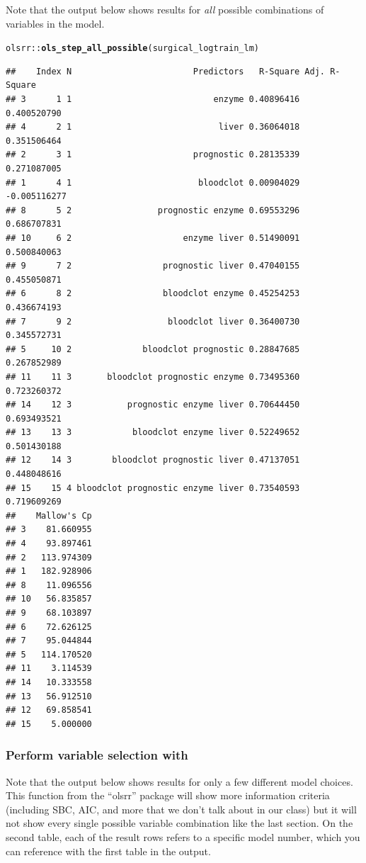 \documentclass{article}\usepackage[]{graphicx}\usepackage[]{color}
\makeatletter
\newcommand{\hlopt}[1]{\textcolor[rgb]{0,0,0}{#1}}%
\newcommand{\hlstd}[1]{\textcolor[rgb]{0.345,0.345,0.345}{#1}}%
\newcommand{\hlkwd}[1]{\textcolor[rgb]{0.737,0.353,0.396}{\textbf{#1}}}%
\newenvironment{kframe}{%
 \def\at@end@of@kframe{}%
 \ifinner\ifhmode%
  \def\at@end@of@kframe{\end{minipage}}%
  \begin{minipage}{\columnwidth}%
 \fi\fi%
 \def\FrameCommand##1{\hskip\@totalleftmargin \hskip-\fboxsep
 \colorbox{shadecolor}{##1}\hskip-\fboxsep
     \hskip-\linewidth \hskip-\@totalleftmargin \hskip\columnwidth}%
 \MakeFramed {\advance\hsize-\width
   \@totalleftmargin\z@ \linewidth\hsize
   \@setminipage}}%
 {\par\unskip\endMakeFramed%
 \at@end@of@kframe}
\newenvironment{knitrout}{}{} %
\makeatother
\begin{document}
Note that the output below shows results for \textit{all} possible combinations of variables in the model.

\begin{knitrout}
\color{fgcolor}\begin{kframe}
\begin{alltt}
\hlstd{olsrr}\hlopt{::}\hlkwd{ols_step_all_possible}\hlstd{(surgical_logtrain_lm)}
\end{alltt}
\begin{verbatim}
##    Index N                        Predictors   R-Square Adj. R-Square
## 3      1 1                            enzyme 0.40896416   0.400520790
## 4      2 1                             liver 0.36064018   0.351506464
## 2      3 1                        prognostic 0.28135339   0.271087005
## 1      4 1                         bloodclot 0.00904029  -0.005116277
## 8      5 2                 prognostic enzyme 0.69553296   0.686707831
## 10     6 2                      enzyme liver 0.51490091   0.500840063
## 9      7 2                  prognostic liver 0.47040155   0.455050871
## 6      8 2                  bloodclot enzyme 0.45254253   0.436674193
## 7      9 2                   bloodclot liver 0.36400730   0.345572731
## 5     10 2              bloodclot prognostic 0.28847685   0.267852989
## 11    11 3       bloodclot prognostic enzyme 0.73495360   0.723260372
## 14    12 3           prognostic enzyme liver 0.70644450   0.693493521
## 13    13 3            bloodclot enzyme liver 0.52249652   0.501430188
## 12    14 3        bloodclot prognostic liver 0.47137051   0.448048616
## 15    15 4 bloodclot prognostic enzyme liver 0.73540593   0.719609269
##    Mallow's Cp
## 3    81.660955
## 4    93.897461
## 2   113.974309
## 1   182.928906
## 8    11.096556
## 10   56.835857
## 9    68.103897
## 6    72.626125
## 7    95.044844
## 5   114.170520
## 11    3.114539
## 14   10.333558
## 13   56.912510
## 12   69.858541
## 15    5.000000
\end{verbatim}
\end{kframe}
\end{knitrout}

\subsubsection*{Perform variable selection with}

Note that the output below shows results for only a few different model choices. This function from the ``olsrr'' package will show more information criteria (including SBC, AIC, and more that we don't talk about in our class) but it will not show every single possible variable combination like the last section. On the second table, each of the result rows refers to a specific model number, which you can reference with the first table in the output.
\end{document}
